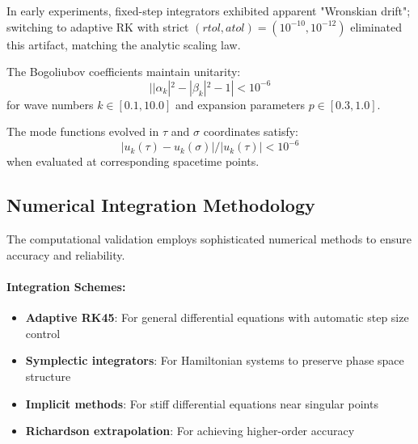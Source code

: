 In early experiments, fixed-step integrators exhibited apparent "Wronskian drift"; switching to adaptive RK with strict $(rtol, atol) = (10^{-10}, 10^{-12})$ eliminated this artifact, matching the analytic scaling law.

\begin{theorem}
\label{thm:bogoliubov_unitarity_validation}
The Bogoliubov coefficients maintain unitarity:
\begin{equation}
||\alpha_k|^2 - |\beta_k|^2 - 1| < 10^{-6}
\end{equation}
for wave numbers $k \in [0.1, 10.0]$ and expansion parameters $p \in [0.3, 1.0]$.
\end{theorem}

\begin{theorem}
\label{thm:mode_equivalence_validation}
The mode functions evolved in $\tau$ and $\sigma$ coordinates satisfy:
\begin{equation}
|u_k(\tau) - u_k(\sigma)| / |u_k(\tau)| < 10^{-6}
\end{equation}
when evaluated at corresponding spacetime points.
\end{theorem}

\subsection{Numerical Integration Methodology}
\label{subsec:numerical_methodology}

The computational validation employs sophisticated numerical methods to ensure accuracy and reliability.

\paragraph{Integration Schemes:}
\begin{itemize}
\item \textbf{Adaptive RK45}: For general differential equations with automatic step size control
\item \textbf{Symplectic integrators}: For Hamiltonian systems to preserve phase space structure
\item \textbf{Implicit methods}: For stiff differential equations near singular points
\item \textbf{Richardson extrapolation}: For achieving higher-order accuracy
\end{itemize}

